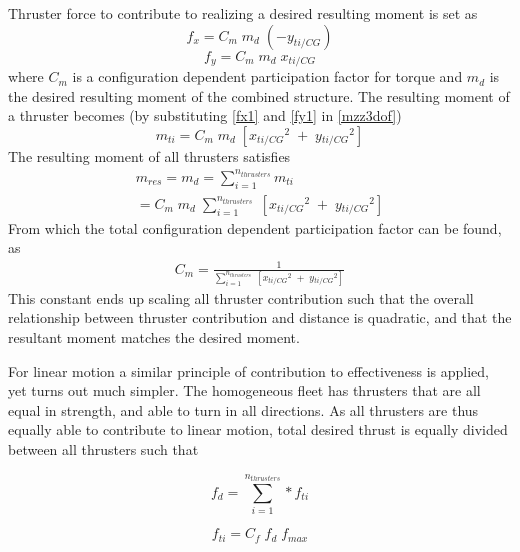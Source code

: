 Thruster force to contribute to realizing a desired resulting moment is set as
\begin{equation}
	f_{x} = C_{m} \; m_{d} \; (- y_{ti/CG})
	\label{fx1}
\end{equation}
\begin{equation}
	f_{y} = C_{m} \; m_{d} \; x_{ti/CG}
	\label{fy1}
\end{equation}
where $C_{m}$ is a configuration dependent participation factor for torque and $m_{d}$ is the desired resulting moment of the combined structure. The resulting moment of a thruster becomes (by substituting \ref{fx1} and \ref{fy1} in \ref{mzz3dof})
\begin{equation}
m_{ti} = C_{m} \; m_{d} \; [ x{_{ti/CG}}^{2} \; + \; y{_{ti/CG}}^{2} ]
\end{equation}
The resulting moment of all thrusters satisfies
\begin{equation}
\begin{split}
m_{res} = m_{d} =  \sum_{i =1}^{n_{thrusters}} m_{ti} \\
= C_{m} \; m_{d} \; \sum_{i =1}^{n_{thrusters}}  \; [ x{_{ti/CG}}^{2} \; + \; y{_{ti/CG}}^{2} ]
\end{split}
\end{equation}
From which the total configuration dependent participation factor can be found, as
\begin{equation}
\begin{split}
C_{m} = \frac{1}{ \sum_{i =1}^{n_{thrusters}}  \; [ x{_{ti/CG}}^{2} \; + \; y{_{ti/CG}}^{2} ] }
\end{split}
\end{equation}
This constant ends up scaling all thruster contribution such that the overall relationship between thruster contribution and distance is quadratic, and that the resultant moment matches the desired moment. 


For linear motion a similar principle of contribution to effectiveness is applied, yet turns out much simpler. The homogeneous fleet has thrusters that are all equal in strength, and able to turn in all directions. As all thrusters are thus equally able to contribute to linear motion, total desired thrust is equally divided between all thrusters such that

\begin{equation}
f_{d} = \sum_{i=1}^{n_{thrusters}} * f_{ti}
\end{equation}

\begin{equation}
f_{ti} = C_{f} \; f_{d}\;  f_{max}
\end{equation}

